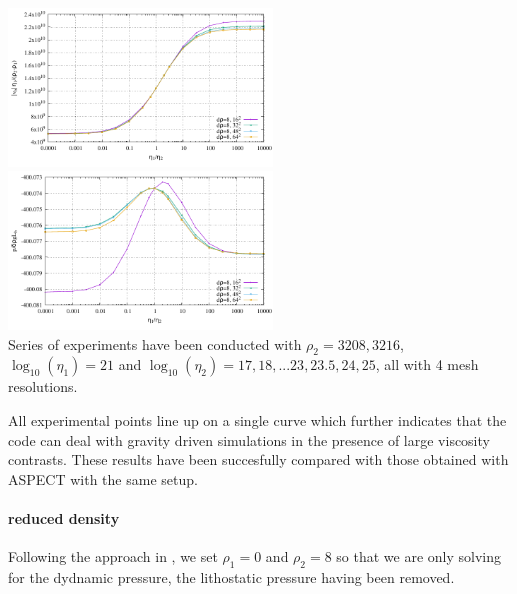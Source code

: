 \begin{center}
\includegraphics[width=7cm]{python_codes/fieldstone_53/results/full/results_v.pdf}
\includegraphics[width=7cm]{python_codes/fieldstone_53/results/full/results_p.pdf}\\
{\captionfont
Series of experiments have been conducted with $\rho_2=3208,3216$, 
$\log_{10}(\eta_1)=21$ and $\log_{10}(\eta_2)=17,18,...23,23.5,24,25$, 
all with 4 mesh resolutions.}
 \end{center}

All experimental points line up on a single curve which further
indicates that the code can deal with gravity driven simulations in the presence
of large viscosity contrasts. These results have been succesfully compared with 
those obtained with ASPECT with the same setup.

\paragraph{reduced density}

Following the approach in \textcite{thba22}, 
we set $\rho_1=0$ and $\rho_2=8$ so that we are only solving for the dydnamic 
pressure, the lithostatic pressure having been removed.

